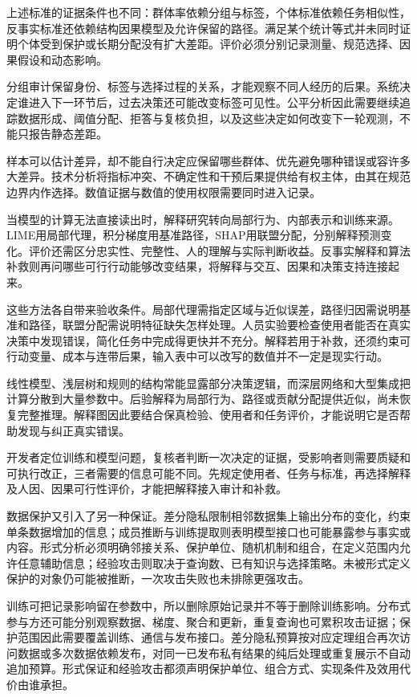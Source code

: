 上述标准的证据条件也不同：群体率依赖分组与标签，个体标准依赖任务相似性，反事实标准还依赖结构因果模型及允许保留的路径。满足某个统计等式并未同时证明个体受到保护或长期分配没有扩大差距。评价必须分别记录测量、规范选择、因果假设和动态影响。

分组审计保留身份、标签与选择过程的关系，才能观察不同人经历的后果。系统决定谁进入下一环节后，过去决策还可能改变标签可见性。公平分析因此需要继续追踪数据形成、阈值分配、拒答与复核负担，以及这些决定如何改变下一轮观测，不能只报告静态差距。

样本可以估计差异，却不能自行决定应保留哪些群体、优先避免哪种错误或容许多大差异。技术分析将指标冲突、不确定性和干预后果提供给有权主体，由其在规范边界内作选择。数值证据与数值的使用权限需要同时进入记录。

当模型的计算无法直接读出时，解释研究转向局部行为、内部表示和训练来源。LIME用局部代理，积分梯度用基准路径，SHAP用联盟分配，分别解释预测变化。评价还需区分忠实性、完整性、人的理解与实际判断收益。反事实解释和算法补救则再问哪些可行行动能够改变结果，将解释与交互、因果和决策支持连接起来。

这些方法各自带来验收条件。局部代理需指定区域与近似误差，路径归因需说明基准和路径，联盟分配需说明特征缺失怎样处理。人员实验要检查使用者能否在真实决策中发现错误，简化任务中完成得更快并不充分。解释若用于补救，还须约束可行动变量、成本与连带后果，输入表中可以改写的数值并不一定是现实行动。

线性模型、浅层树和规则的结构常能显露部分决策逻辑，而深层网络和大型集成把计算分散到大量参数中。后验解释为局部行为、路径或贡献分配提供近似，尚未恢复完整推理。解释图因此要结合保真检验、使用者和任务评价，才能说明它是否帮助发现与纠正真实错误。

开发者定位训练和模型问题，复核者判断一次决定的证据，受影响者则需要质疑和可执行改正，三者需要的信息可能不同。先规定使用者、任务与标准，再选择解释及人因、因果可行性评价，才能把解释接入审计和补救。

数据保护又引入了另一种保证。差分隐私限制相邻数据集上输出分布的变化，约束单条数据增加的信息；成员推断与训练提取则表明模型接口也可能暴露参与事实或内容。形式分析必须明确邻接关系、保护单位、随机机制和组合，在定义范围内允许任意辅助信息；经验攻击则取决于查询数、已有知识与选择策略。未被形式定义保护的对象仍可能被推断，一次攻击失败也未排除更强攻击。

训练可把记录影响留在参数中，所以删除原始记录并不等于删除训练影响。分布式参与方还可能分别观察数据、梯度、聚合和更新，重复查询也可累积攻击证据；保护范围因此需要覆盖训练、通信与发布接口。差分隐私预算按对应定理组合再次访问数据或多次数据依赖发布，对同一已发布私有结果的纯后处理或重复展示不自动追加预算。形式保证和经验攻击都须声明保护单位、组合方式、实现条件及效用代价由谁承担。

